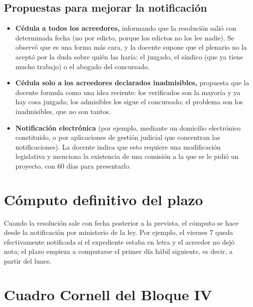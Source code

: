\documentclass[12pt,oneside]{book}
\begin{document}
\subsection{Propuestas para mejorar la notificación}

\begin{itemize}
    \item \textbf{Cédula a todos los acreedores,} informando que la resolución salió con determinada fecha (no por edicto, porque los edictos no los lee nadie). Se observó que es una forma más cara, y la docente supone que el plenario no la aceptó por la duda sobre quién las haría: el juzgado, el síndico (que ya tiene mucho trabajo) o el abogado del concursado.
    \item \textbf{Cédula solo a los acreedores declarados inadmisibles,} propuesta que la docente formula como una idea reciente: los verificados son la mayoría y ya hay cosa juzgada; los admisibles los sigue el concursado; el problema son los inadmisibles, que no son tantos.
    \item \textbf{Notificación electrónica} (por ejemplo, mediante un domicilio electrónico constituido, o por aplicaciones de gestión judicial que concentran las notificaciones). La docente indica que esto requiere una modificación legislativa y menciona la existencia de una comisión a la que se le pidió un proyecto, con 60 días para presentarlo.
\end{itemize}

\section{Cómputo definitivo del plazo}

Cuando la resolución sale con fecha posterior a la prevista, el cómputo se hace desde la notificación por ministerio de la ley. Por ejemplo, el viernes 7 queda efectivamente notificada si el expediente estaba en letra y el acreedor no dejó nota; el plazo empieza a computarse el primer día hábil siguiente, es decir, a partir del lunes.

\section{Cuadro Cornell del Bloque IV}
\end{document}
